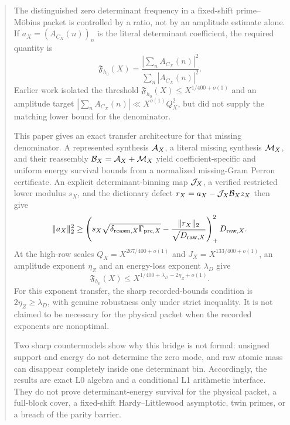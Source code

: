 \begin{abstract}
The distinguished zero determinant frequency in a fixed-shift
prime--M\"obius packet is controlled by a ratio, not by an amplitude
estimate alone.  If \(a_X=(A_{C_X}(n))_n\) is the literal determinant
coefficient, the required quantity is
\[
 \mathfrak F_{h_0}(X)
 =\frac{|\sum_n A_{C_X}(n)|^2}
        {\sum_n|A_{C_X}(n)|^2}.
\]
Earlier work isolated the threshold
\(\mathfrak F_{h_0}(X)\le X^{1/400+o(1)}\) and an amplitude target
\(|\sum_n A_{C_X}(n)|\ll X^{o(1)}Q_X^2\), but did not supply the
matching lower bound for the denominator.

This paper gives an exact transfer architecture for that missing
denominator.  A represented synthesis \(\cA_X\), a literal missing
synthesis \(\cM_X\), and their reassembly
\(\cB_X=\cA_X+\cM_X\) yield coefficient-specific and uniform energy
survival bounds from a normalized missing-Gram Perron certificate.
An explicit determinant-binning map \(\cJ_X\), a verified restricted
lower modulus \(s_X\), and the dictionary defect
\(r_X=a_X-\cJ_X\cB_Xz_X\) then give
\[
 \|a_X\|_2^2\ge
 \left(
 s_X\sqrt{\delta_{{\rm reasm},X}\Gamma_{{\rm pre},X}}
 -\frac{\|r_X\|_2}{\sqrt{D_{{\rm raw},X}}}
 \right)_+^2D_{{\rm raw},X}.
\]
At the high-row scales
\(Q_X=X^{267/400+o(1)}\) and
\(J_X=X^{133/400+o(1)}\), an amplitude exponent
\(\eta_Z\) and an energy-loss exponent \(\lambda_D\) give
\[
 \mathfrak F_{h_0}(X)
 \le X^{1/400+\lambda_D-2\eta_Z+o(1)}.
\]
For this exponent transfer, the sharp recorded-bounds condition is
\(2\eta_Z\ge\lambda_D\), with genuine robustness only under strict
inequality.  It is not claimed to be necessary for the physical
packet when the recorded exponents are nonoptimal.

Two sharp countermodels show why this bridge is not formal:
unsigned support and energy do not determine the zero mode, and raw
atomic mass can disappear completely inside one determinant bin.
Accordingly, the results are exact L0 algebra and a conditional L1
arithmetic interface.  They do not prove determinant-energy survival
for the physical packet, a full-block cover, a fixed-shift
Hardy--Littlewood asymptotic, twin primes, or a breach of the parity
barrier.
\end{abstract}
